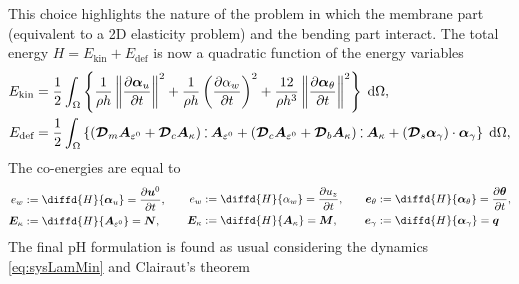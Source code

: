 This choice highlights the nature of the problem in which the membrane part (equivalent to a 2D elasticity problem) and the bending part interact. The total energy $H=E_{\text{kin}} + E_{\text{def}}$ is now a quadratic function of the energy variables
\begin{equation*}
\begin{aligned}
E_{\text{kin}} &= \energy{\frac{1}{\rho h} \norm{\diffp{\bm{\alpha}_u}{t}}^2 + \frac{1}{\rho h} \left(\diffp{\alpha_w}{t}\right)^2 + \frac{12}{\rho h^3} \norm{\diffp{\bm{\alpha}_\theta}{t}}^2}, \\
E_{\text{def}} &= \energy{(\bm{\mathcal{D}}_m \bm{A}_{\varepsilon^0} + \bm{\mathcal{D}}_c \bm{A}_{\kappa}) \cddot \bm{A}_{\varepsilon^0} + (\bm{\mathcal{D}}_c \bm{A}_{\varepsilon^0} + \bm{\mathcal{D}}_b \bm{A}_{\kappa}) \cddot \bm{A}_{\kappa} + (\bm{\mathcal{D}}_s \bm{\alpha}_{\gamma}) \cdot \bm{\alpha}_{\gamma}}, 
\end{aligned}
\end{equation*}
The co-energies are equal to
\begin{equation}
\begin{aligned}
e_w &:= \diffd{H}{\bm\alpha_u} = \diffp{\bm{u}^0}{t},\\
\bm{E}_{\kappa} &:= \diffd{H}{\bm{A}_{\varepsilon^0}} = \bm{N},\\
\end{aligned} \qquad
\begin{aligned}
e_w &:= \diffd{H}{\alpha_w} = \diffp{u_z}{t}, \\
\bm{E}_{\kappa} &:= \diffd{H}{\bm{A}_{\kappa}} = \bm{M}, \\
\end{aligned} \qquad
\begin{aligned}
\bm{e}_{\theta} &:= \diffd{H}{\bm\alpha_{\theta}} = \diffp{\bm{\theta}}{t}, \\
\bm{e}_{\gamma} &:= \diffd{H}{\bm\alpha_\gamma} = \bm{q}  \\
\end{aligned}
\end{equation}
The final pH formulation is found as usual considering the dynamics \eqref{eq:sysLamMin} and Clairaut's theorem

